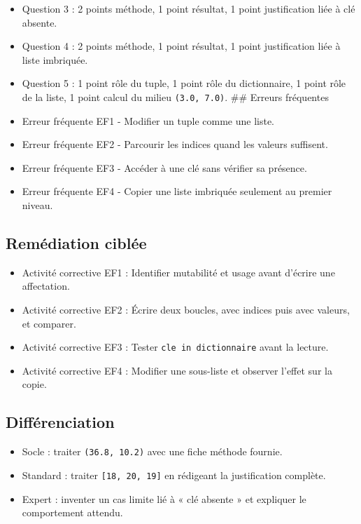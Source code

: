 \begin{itemize}
  Question 2 : 2 points méthode, 1 point résultat, 1 point justification
  liée à liste vide.
\item
  Question 3 : 2 points méthode, 1 point résultat, 1 point justification
  liée à clé absente.
\item
  Question 4 : 2 points méthode, 1 point résultat, 1 point justification
  liée à liste imbriquée.
\item
  Question 5 : 1 point rôle du tuple, 1 point rôle du dictionnaire, 1
  point rôle de la liste, 1 point calcul du milieu \texttt{(3.0,\ 7.0)}.
  \#\# Erreurs fréquentes
\item
  Erreur fréquente EF1 - Modifier un tuple comme une liste.
\item
  Erreur fréquente EF2 - Parcourir les indices quand les valeurs
  suffisent.
\item
  Erreur fréquente EF3 - Accéder à une clé sans vérifier sa présence.
\item
  Erreur fréquente EF4 - Copier une liste imbriquée seulement au premier
  niveau.
\end{itemize}

\subsection{Remédiation ciblée}

\begin{itemize}
\tightlist
\item
  Activité corrective EF1 : Identifier mutabilité et usage avant
  d'écrire une affectation.
\item
  Activité corrective EF2 : Écrire deux boucles, avec indices puis avec
  valeurs, et comparer.
\item
  Activité corrective EF3 : Tester \texttt{cle\ in\ dictionnaire} avant
  la lecture.
\item
  Activité corrective EF4 : Modifier une sous-liste et observer l'effet
  sur la copie.
\end{itemize}

\subsection{Différenciation}

\begin{itemize}
\tightlist
\item
  Socle : traiter \texttt{(36.8,\ 10.2)} avec une fiche méthode fournie.
\item
  Standard : traiter \texttt{{[}18,\ 20,\ 19{]}} en rédigeant la
  justification complète.
\item
  Expert : inventer un cas limite lié à « clé absente » et expliquer le
  comportement attendu.
\end{itemize}


